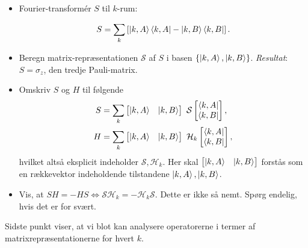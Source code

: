 \documentclass[11pt, a4paper]{article}
\begin{document}
\begin{itemize}
	\item Fourier-transformér $S$ til $k$-rum: 

	\begin{equation}
	S = \sum_k \left[\ket{k, A}\bra{k, A} - \ket{k, B}\bra{k, B}\right]. 
	\label{eq.S_i_krum}
	\end{equation}

	\item Beregn matrix-repræsentationen $\mathcal{S}$ af $S$ i basen $\{\ket{k, A}, \ket{k, B}\}$. \textit{Resultat}: $S = \sigma_z$, den tredje Pauli-matrix. 

	\item Omskriv $S$ og $H$ til følgende
	\begin{align}
	S &= \sum_k \begin{bmatrix}\ket{k, A} & \ket{k, B} \end{bmatrix} \mathcal{S} \begin{bmatrix}\bra{k, A} \\ \bra{k, B} \end{bmatrix}, \nonumber \\
	H &= \sum_k \begin{bmatrix}\ket{k, A} & \ket{k, B} \end{bmatrix} \mathcal{H}_k \begin{bmatrix}\bra{k, A} \\ \bra{k, B} \end{bmatrix}, 
	\end{align}
	hvilket altså eksplicit indeholder $\mathcal{S}, \mathcal{H}_k$. Her skal $\begin{bmatrix}\ket{k, A} & \ket{k, B} \end{bmatrix}$ forstås som en rækkevektor indeholdende tilstandene $\ket{k, A}, \ket{k, B}$. 

	\item Vis, at $SH = -HS \Leftrightarrow \mathcal{S}\mathcal{H}_k = -\mathcal{H}_k\mathcal{S}$. Dette er ikke så nemt. Spørg endelig, hvis det er for svært. 
\end{itemize}

Sidste punkt viser, at vi blot kan analysere operatorerne i termer af matrixrepræsentationerne for hvert $k$. 
\end{document}
